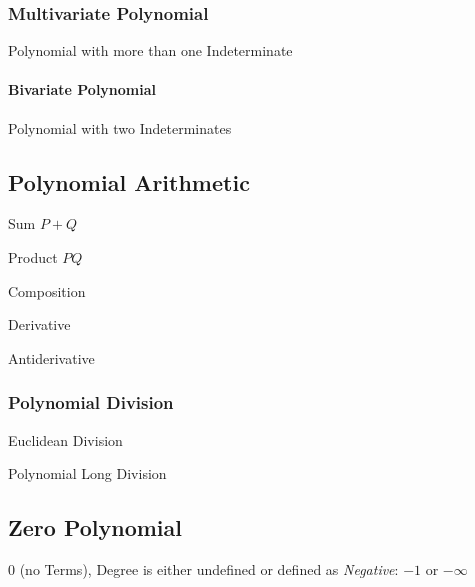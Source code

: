 \subsubsection{Multivariate Polynomial}\label{sec:multivariate_polynomial}

Polynomial with more than one Indeterminate



\paragraph{Bivariate Polynomial}\label{sec:bivariate_polynomial}\hfill

Polynomial with two Indeterminates



\subsection{Polynomial Arithmetic}\label{sec:polynomial_arithmetic}

Sum $P + Q$

Product $P Q$

Composition

Derivative

Antiderivative



\subsubsection{Polynomial Division}\label{sec:polynomial_division}

Euclidean Division

Polynomial Long Division



\subsection{Zero Polynomial}\label{sec:zero_polynomial}

$0$ (no Terms), Degree is either undefined or defined as \emph{Negative}: $-1$
or $-\infty$



